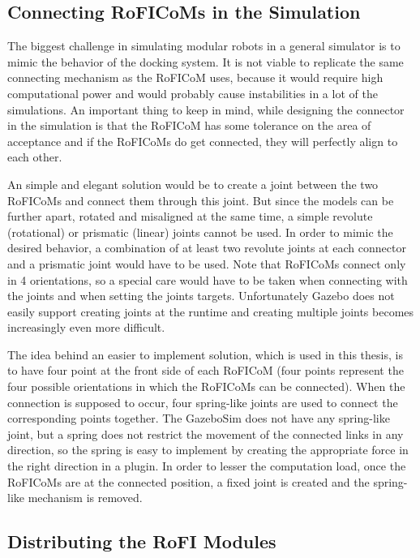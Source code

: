 \documentclass[
  digital, %
  table,   %
  oneside, %
  nolof,     %
  nolot,     %
]{fithesis3}
\begin{document}
\subsection{Connecting RoFICoMs in the Simulation}

The biggest challenge in simulating modular robots in a general simulator is to mimic the behavior of the docking system.
It is not viable to replicate the same connecting mechanism as the RoFICoM uses, because it would require high computational power and would probably cause instabilities in a lot of the simulations.
An important thing to keep in mind, while designing the connector in the simulation is that the RoFICoM has some tolerance\cite{roficom} on the area of acceptance and if the RoFICoMs do get connected, they will perfectly align to each other.

An simple and elegant solution would be to create a joint between the two RoFICoMs and connect them through this joint.
But since the models can be further apart, rotated and misaligned at the same time, a simple revolute (rotational) or prismatic (linear) joints cannot be used.
In order to mimic the desired behavior, a combination of at least two revolute joints at each connector and a prismatic joint would have to be used.
Note that RoFICoMs connect only in 4 orientations, so a special care would have to be taken when connecting with the joints and when setting the joints targets.
Unfortunately Gazebo does not easily support creating joints at the runtime and creating multiple joints becomes increasingly even more difficult.

The idea behind an easier to implement solution, which is used in this thesis, is to have four point at the front side of each RoFICoM (four points represent the four possible orientations in which the RoFICoMs can be connected).
When the connection is supposed to occur, four spring-like joints are used to connect the corresponding points together.
The GazeboSim does not have any spring-like joint, but a spring does not restrict the movement of the connected links in any direction, so the spring is easy to implement by creating the appropriate force in the right direction in a plugin.
In order to lesser the computation load, once the RoFICoMs are at the connected position, a fixed joint is created and the spring-like mechanism is removed.

\subsection{Distributing the RoFI Modules}
\end{document}
